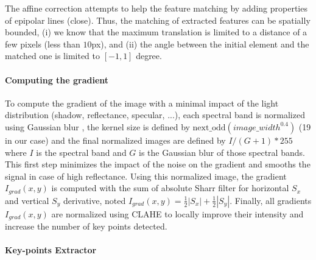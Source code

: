 \documentclass[]{elsarticle}
\begin{document}
	\par The affine correction attempts to help the feature matching by adding properties of epipolar lines (close).
	Thus, the matching of extracted features can be spatially bounded,
	(i) we know that the maximum translation is limited to a distance of a few pixels (less than $10$px),
	and (ii) the angle between the initial element and the matched one is limited to $[-1,1]$ degree.
	
	\paragraph{Computing the gradient} \label{sec:pre-processing}
	To compute the gradient of the image with a minimal impact of the light distribution (shadow, reflectance, specular, ...),
	each spectral band is normalized using Gaussian blur \cite{sage0303}, the kernel size is defined by $\text{next\_odd}(image\_width^{0.4})$ (19 in our case)
	and the final normalized images are defined by $I/(G+1)*255$ where $I$ is the spectral band and $G$ is the Gaussian blur of those spectral bands.
	This first step minimizes the impact of the noise on the gradient and smooths the signal in case of high reflectance.
	Using this normalized image, the gradient $I_{grad}(x,y)$ is computed with the sum of absolute Sharr filter \cite{Seitz}
	for horizontal $S_x$ and vertical $S_y$ derivative, noted $I_{grad}(x,y)=\frac{1}{2}|S_x|+\frac{1}{2}|S_y|$.
	Finally, all gradients $I_{grad}(x,y)$ are normalized using CLAHE \cite{zuiderveld1994contrast} to locally improve their intensity and increase the number of key points detected.%
	
	\paragraph{Key-points Extractor}
	
\end{document}
